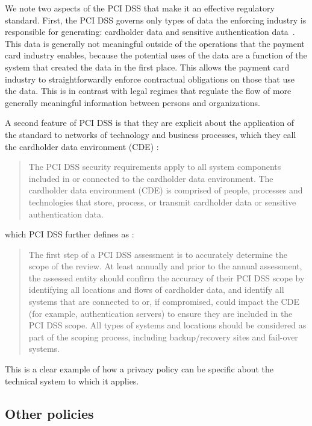 \documentclass[../thesis.tex]{subfiles}
\begin{document}
We note two aspects of the PCI DSS that make it an effective 
regulatory standard.
First, the PCI DSS governs only types of data the enforcing 
industry is responsible for generating: cardholder data and 
sensitive authentication data~\cite{pcisecuritystandardscouncil2016DSS}.
This data is generally not meaningful outside of the operations 
that the payment card industry enables, because the potential 
uses of the data are a function of the system that created 
the data in the first place.
This allows the payment card industry to 
straightforwardly enforce contractual obligations on those 
that use the data.
This is in contrast with legal regimes that regulate the 
flow of more generally meaningful information between persons 
and organizations.

A second feature of PCI DSS is that they are explicit about 
the application of the standard to networks of technology and 
business processes,
which they call the cardholder data environment 
(CDE) \cite{pcisecuritystandardscouncil2016DSS}:
\begin{quote}
  The PCI DSS security requirements apply to all system components 
included in or connected to the cardholder data environment.
  The cardholder data environment (CDE) is comprised of people, 
processes and technologies that store, process, or transmit 
cardholder data or sensitive authentication data.
\end{quote}
which PCI DSS further defines as 
\cite{pcisecuritystandardscouncil2016DSS}:
\begin{quote}
  The first step of a PCI DSS assessment is to accurately 
determine the scope of the review.
  At least annually and prior to the annual assessment, 
the assessed entity should confirm the accuracy of their 
PCI DSS scope by identifying all locations and flows of 
cardholder data, and identify all systems that are connected 
to or, if compromised, could impact the CDE (for example, 
authentication servers) to ensure they are included in the
  PCI DSS scope.
  All types of systems and locations should be considered as 
part of the scoping process, including backup/recovery sites 
and fail-over systems.
\end{quote}

This is a clear example of how a privacy policy can be specific
about the technical system to which it applies.

\subsection{Other policies}
\end{document}
